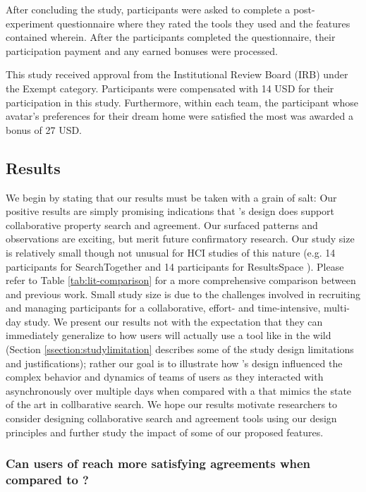 After concluding the study, participants were asked to complete a post-experiment questionnaire where they rated the tools they used and the features contained wherein. After the participants completed the questionnaire, their participation payment and any earned bonuses were processed. 

This study received approval from the Institutional Review Board (IRB) under the Exempt category. Participants were compensated with 14 USD for their participation in this study. Furthermore, within each team, the participant whose avatar's preferences for their dream home were satisfied the most was awarded a bonus of 27 USD. 


\subsection{Results} \label{ssection:results}
We begin by stating that our results must be taken with a grain of salt: Our positive results are simply promising indications that \tool's design does support collaborative property search and agreement. Our surfaced patterns and observations are exciting, but merit future confirmatory research. Our study size is relatively small though not unusual for HCI studies of this nature (e.g. 14 participants for SearchTogether \cite{searchtogether} and 14 participants for ResultsSpace  \cite{TeamSearch}). Please refer to Table \ref{tab:lit-comparison} for a more comprehensive comparison between \tool and previous work. 
Small study size is due to the challenges involved in recruiting and managing participants for a collaborative, effort- and time-intensive, multi-day study. 
We present our results not with the expectation that they can immediately generalize to how users will actually use a tool like \tool in the wild (Section \ref{ssection:studylimitation} describes some of the study design limitations and justifications); rather our goal is to illustrate how \tool's design influenced the complex behavior and  dynamics of teams of users as they interacted with \tool asynchronously over multiple days when compared with a \baseline that mimics the state of the art in collbarative search. We hope our results motivate researchers to consider designing collaborative search and agreement tools using our design principles and further study the impact of some of our proposed features.

\subsubsection{Can users of \tool reach more satisfying agreements when compared to \baseline?}

